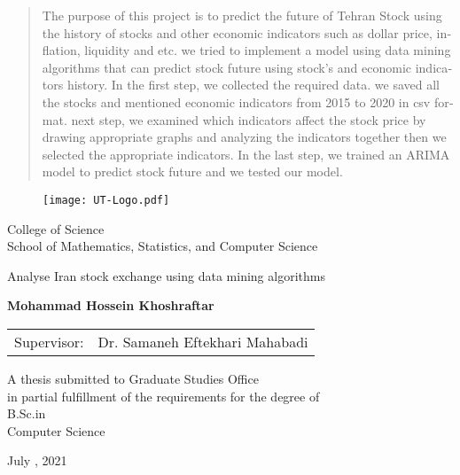 \documentclass[12pt]{report}
\begin{document}
\begin{latin}
\begin{abstract}
The purpose of this project is to predict the future of Tehran Stock using the history of stocks and other economic indicators such as dollar price, inflation, liquidity and etc. we tried to implement a model using data mining algorithms that can predict stock future using stock's and economic indicators history. In the first step, we collected the required data. we saved all the stocks and mentioned economic indicators from 2015 to 2020 in csv format. next step, we examined which indicators affect the stock price by drawing appropriate graphs and analyzing the indicators together then we selected the appropriate indicators. In the last step, we trained an ARIMA model to predict stock future and we tested our model.
\end{abstract}
\newpage

\begin{figure}
\centering
\texttt{[image: UT-Logo.pdf]}
\end{figure}
\begin{center}

College of Science\\
School of Mathematics, Statistics, and Computer Science
\end{center}

\begin{center}
\huge{Analyse Iran stock exchange using data mining algorithms}
\end{center}

\begin{center}
\end{center}

\begin{center}
\textbf{
Mohammad Hossein Khoshraftar
}
\end{center}

\begin{center}
\begin{tabular}{rr}
Supervisor: & Dr. Samaneh Eftekhari Mahabadi \\

\end{tabular}
\end{center}

\vspace{3cm}
\begin{center}
A thesis submitted to Graduate Studies Office\\
in partial fulfillment of the requirements for the degree of \\
B.Sc.in\\
 Computer Science
\end{center}

\begin{center}
July , 2021
\end{center}

\pagenumbering{}

\end{latin}
\end{document}
